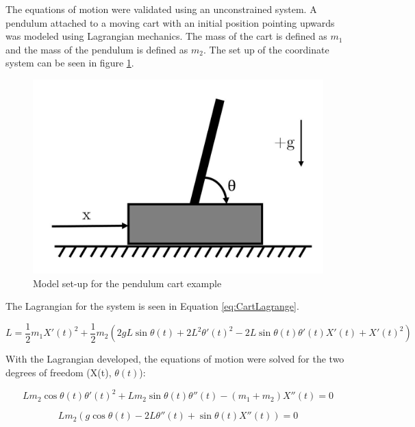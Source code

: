 The equations of motion were validated using an unconstrained system. A pendulum  attached to a moving cart with an initial position pointing upwards was modeled using Lagrangian mechanics. 
The mass of the cart is defined as $m_{1}$ and the mass of the pendulum is defined as $m_{2}$. 
The set up of the coordinate system can be seen in figure \ref{fig:pendulumcart}.

\begin{figure}[!htb]
	\centering
	\includegraphics[width=\linewidth]{pendulumcart}
	\caption{Model set-up for the pendulum cart example}\label{fig:pendulumcart}
	\endminipage
\end{figure} 

The Lagrangian for the system is seen in Equation \ref{eq:CartLagrange}.

\begin{equation}
\label{eq:CartLagrange}
L = \frac{1}{2}m_{1}X'(t)^2+\frac{1}{2}m_{2}(2gL\sin\theta(t)+2L^2\theta'(t)^2-2L\sin\theta(t)\theta'(t)X'(t)+X'(t)^2) 
\end{equation}

With the Lagrangian developed, the equations of motion were solved for the two degrees of freedom (X(t), $\theta(t)$):

\begin{equation}
Lm_{2}\cos\theta(t)\theta'(t)^2+Lm_{2}\sin\theta(t)\theta''(t)-(m_{1}+m_{2})X''(t) = 0
\end{equation}

\begin{equation}
Lm_{2}(g\cos\theta(t)-2L\theta''(t)+\sin\theta(t)X''(t)) = 0
\end{equation}

